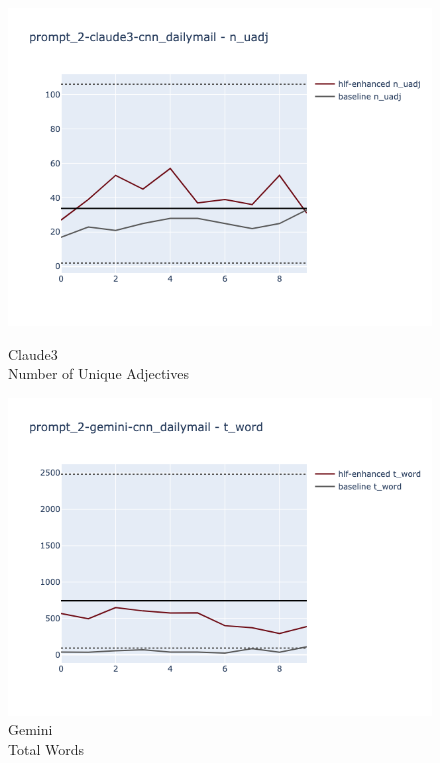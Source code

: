 \documentclass[runningheads,a4paper,11pt]{article}
\begin{document}
\begin{figure}[ht!]
    \centering
    \begin{minipage}{0.32\textwidth}
        \includegraphics[width=\linewidth]{plots/prompt_2_ifd/prompt_2-claude3-cnn_dailymail/prompt_2-claude3-cnn_dailymail_n_uadj.png}
        \caption{Claude3\\Number of Unique Adjectives}
        \label{fig-p2-ifd-claude3-nuadj}
    \end{minipage}
    \hfill
    \begin{minipage}{0.32\textwidth}
        \includegraphics[width=\linewidth]{plots/prompt_2_ifd/prompt_2-gemini-cnn_dailymail/prompt_2-gemini-cnn_dailymail_t_word.png}
        \caption{Gemini\\Total Words}

\end{minipage}
\end{figure}
\end{document}
